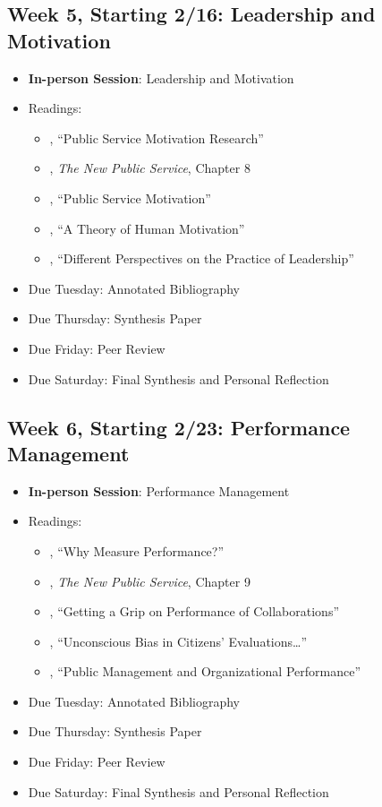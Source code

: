 \documentclass[11pt, letterpaper]{article}
\begin{document}
\subsection*{Week 5, Starting 2/16: Leadership and Motivation}
\begin{itemize}
    \item \textbf{In-person Session}: Leadership and Motivation
    \item Readings:
        \begin{itemize}
            \item \citet{Christensen2017}, ``Public Service Motivation Research'' 
            \item \citet{Denhardt2015}, \emph{The New Public Service}, Chapter 8 
            \item \citet{Lachance2017}, ``Public Service Motivation'' 
            \item \citet{maslow1943}, ``A Theory of Human Motivation'' 
            \item \citet{Fairholm2004}, ``Different Perspectives on the Practice of Leadership'' 
        \end{itemize}
    \item Due Tuesday: Annotated Bibliography
    \item Due Thursday: Synthesis Paper
    \item Due Friday: Peer Review
    \item Due Saturday: Final Synthesis and Personal Reflection
\end{itemize}

\subsection*{Week 6, Starting 2/23: Performance Management}
\begin{itemize}
    \item \textbf{In-person Session}: Performance Management
    \item Readings:
        \begin{itemize}
            \item \citet{Behn2003}, ``Why Measure Performance?'' 
            \item \citet{Denhardt2015}, \emph{The New Public Service}, Chapter 9 
            \item \citet{douglas2021}, ``Getting a Grip on Performance of Collaborations'' 
            \item \citet{marvel2015}, ``Unconscious Bias in Citizens' Evaluations\dots'' 
            \item \citet{nicholson-crotty2004}, ``Public Management and Organizational Performance'' 
        \end{itemize}
    \item Due Tuesday: Annotated Bibliography
    \item Due Thursday: Synthesis Paper
    \item Due Friday: Peer Review
    \item Due Saturday: Final Synthesis and Personal Reflection
\end{itemize}
\end{document}
